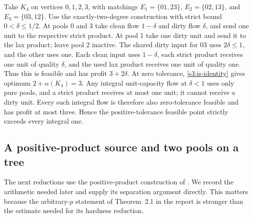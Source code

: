 \begin{example}\label{s3:tolerance-example}
Take $K_4$ on vertices $0,1,2,3$, with matchings
$E_1=\{01,23\}$, $E_2=\{02,13\}$, and $E_3=\{03,12\}$.
Use the exactly-two-degree construction with strict bound
$0<\delta\le1/2$. At pools 0 and 3 take clean flow $1-\delta$ and
dirty flow $\delta$, and send one unit to the respective strict product.
At pool 1 take one dirty unit and send it to the lax product; leave pool
2 inactive. The shared dirty input for $03$ uses $2\delta\le1$, and
the other uses one. Each clean input uses $1-\delta$, each strict product
receives one unit of quality $\delta$, and the used lax product receives
one unit of quality one. Thus this is feasible and has profit
$3+2\delta$. At zero tolerance, \eqref{s3:is-identity} gives optimum
$2+\alpha(K_4)=3$. Any integral unit-capacity flow at $\delta<1$
uses only pure pools, and a strict product receives at most one unit;
it cannot receive a dirty unit. Every such integral flow is therefore
also zero-tolerance feasible and has profit at most three. Hence the
positive-tolerance feasible point strictly exceeds every integral one.
\end{example}

\subsection{A positive-product source and two pools on a tree}\label{s3:positive-product}

The next reductions use the positive-product construction of
\citet[METR95-13, Sections~2--3, pp.~2--7]{s3:matsui1996}. We record the
arithmetic needed later and supply its separation argument directly.
This matters because the arbitrary-$p$ statement of Theorem~2.1 in the
report is stronger than the estimate needed for its hardness reduction.

